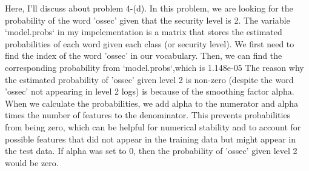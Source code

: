\documentclass[10pt]{article}
\begin{document}
Here, I'll discuss about problem 4-(d).
In this problem, we are looking for the probability of the word 'ossec' given that the security level is 2. The variable `model.probs` in my impelementation is a matrix that stores the estimated probabilities of each word given each class (or security level). 
We first need to find the index of the word 'ossec' in our vocabulary. Then, we can find the corresponding probability from `model.probs`,which is 1.148e-05
The reason why the estimated probability of 'ossec' given level 2 is non-zero (despite the word 'ossec' not appearing in level 2 logs) is because of the smoothing factor alpha. 
When we calculate the probabilities, we add alpha to the numerator and alpha times the number of features to the denominator. 
This prevents probabilities from being zero, which can be helpful for numerical stability and to account for possible features that did not appear in the training data but might appear in the test data. 
If alpha was set to 0, then the probability of 'ossec' given level 2 would be zero. 

\appendix
\end{document}
